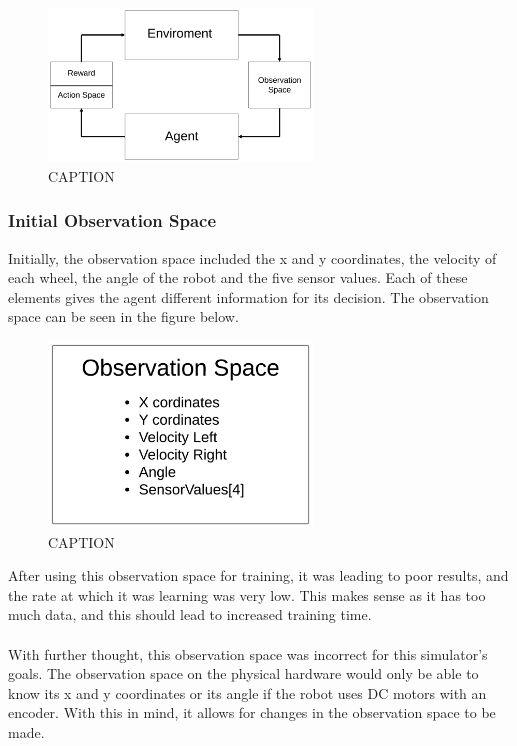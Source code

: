 \documentclass[12pt]{article}
\begin{document}
\begin{figure}[H]
\label{fig:}
\centering
\includegraphics[width=7cm]{imgs/ObservationSpace.png}
\caption{CAPTION}
\end{figure}

 

\subsubsection{Initial Observation Space}

Initially, the observation space included the x and y coordinates, the velocity of each wheel, the angle of the robot and the five sensor values. Each of these elements gives the agent different information for its decision. The observation space can be seen in the figure below.

\begin{figure}[H]
\label{fig:}
\centering
\includegraphics[width=7cm]{imgs/InitialObsSpace.png}
\caption{CAPTION}
\end{figure}

 
After using this observation space for training, it was leading to poor results, and the rate at which it was learning was very low. This makes sense as it has too much data, and this should lead to increased training time.
\\\\
With further thought, this observation space was incorrect for this simulator's goals. The observation space on the physical hardware would only be able to know its x and y coordinates or its angle if the robot uses DC motors with an encoder. With this in mind, it allows for changes in the observation space to be made.
\end{document}
